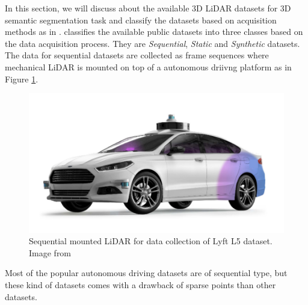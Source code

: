     In this section, we will discuss about the available 3D LiDAR datasets for 3D semantic segmentation task and classify the datasets based on acquisition methods as in \cite{survey3d}.
    \cite{survey3d} classifies the available public datasets into three classes based on the data acquisition process.
    They are \textit{Sequential}, \textit{Static} and \textit{Synthetic} datasets.
    The data for sequential datasets are collected as frame sequences where mechanical LiDAR is mounted on top of a autonomous driivng platform as in Figure \ref{fig:seq_data_lyft}.
    \begin{figure}[h!]
        \centering
        \includegraphics[scale=0.25]{images/sequential_lyft.png}
        \caption{Sequential mounted LiDAR for data collection of Lyft L5 dataset. Image from \cite{Lyftl5}}
        \label{fig:seq_data_lyft}
    \end{figure}
    Most of the popular autonomous driving datasets are of sequential type, but these kind of datasets comes with a drawback of sparse points than other datasets.
    
